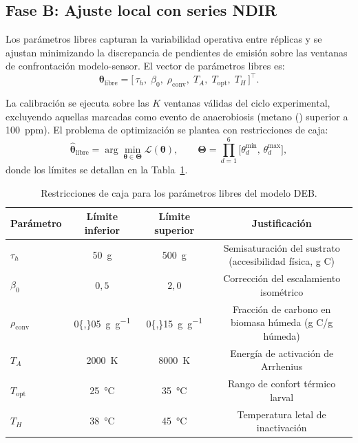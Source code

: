 \subsection{Fase B: Ajuste local con series NDIR}

Los parámetros libres capturan la variabilidad operativa entre réplicas y se ajustan minimizando la discrepancia de pendientes de emisión sobre las ventanas de confrontación modelo-sensor. El vector de parámetros libres es:
\begin{equation}
\boldsymbol{\theta}_{\mathrm{libre}} = \bigl[\,\tau_h,\;\beta_0,\;\rho_{\mathrm{conv}},\;T_A,\;T_{\mathrm{opt}},\;T_H\,\bigr]^{\top}.
\label{eq:parametros_libres}
\end{equation}

La calibración se ejecuta sobre las $K$ ventanas válidas del ciclo experimental, excluyendo aquellas marcadas como evento de anaerobiosis (metano () superior a \SI{100}{ppm}). El problema de optimización se plantea con restricciones de caja:
\begin{equation}
\hat{\boldsymbol{\theta}}_{\mathrm{libre}} = \arg\min_{\boldsymbol{\theta} \in \boldsymbol{\Theta}} \mathcal{L}(\boldsymbol{\theta}),
\qquad
\boldsymbol{\Theta} = \prod_{d=1}^{6} \bigl[\theta_d^{\min},\,\theta_d^{\max}\bigr],
\label{eq:optimizacion_caja}
\end{equation}
donde los límites se detallan en la Tabla~\ref{tab:restricciones_caja}.

\begin{table}[htbp]
\centering
\caption{Restricciones de caja para los parámetros libres del modelo DEB.}
\label{tab:restricciones_caja}
\begin{tabular}{@{}lccc@{}}
\toprule
Parámetro & Límite inferior & Límite superior & Justificación \\
\midrule
$\tau_h$ & \SI{50}{\gram} & \SI{500}{\gram} & Semisaturación del sustrato (accesibilidad física, g C) \\
$\beta_0$ & $0{,}5$ & $2{,}0$ & Corrección del escalamiento isométrico \\
$\rho_{\mathrm{conv}}$ & \SI{0{,}05}{\gram\per\gram} & \SI{0{,}15}{\gram\per\gram} & Fracción de carbono en biomasa húmeda (g C/g húmeda) \\
$T_A$ & \SI{2000}{\kelvin} & \SI{8000}{\kelvin} & Energía de activación de Arrhenius \\
$T_{\mathrm{opt}}$ & \SI{25}{\celsius} & \SI{35}{\celsius} & Rango de confort térmico larval \\
$T_H$ & \SI{38}{\celsius} & \SI{45}{\celsius} & Temperatura letal de inactivación \\
\bottomrule
\end{tabular}
\end{table}

